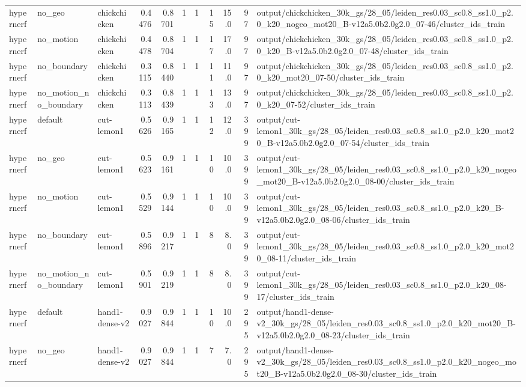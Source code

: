 \documentclass[10pt]{article}
\begin{document}
\begin{longtable}{lllrrrrrrrp{8cm}}
hypernerf & no\_geo & chickchicken & 0.4476 & 0.8701 & 1 & 1 & 15 & 15.0 & 97 & output/chickchicken\_30k\_gs/28\_05/leiden\_res0.03\_sc0.8\_ss1.0\_p2.0\_k20\_nogeo\_mot20\_B-v12a5.0b2.0g2.0\_07-46/cluster\_ids\_train \\
hypernerf & no\_motion & chickchicken & 0.4478 & 0.8704 & 1 & 1 & 17 & 17.0 & 97 & output/chickchicken\_30k\_gs/28\_05/leiden\_res0.03\_sc0.8\_ss1.0\_p2.0\_k20\_B-v12a5.0b2.0g2.0\_07-48/cluster\_ids\_train \\
hypernerf & no\_boundary & chickchicken & 0.3115 & 0.8440 & 1 & 1 & 11 & 11.0 & 97 & output/chickchicken\_30k\_gs/28\_05/leiden\_res0.03\_sc0.8\_ss1.0\_p2.0\_k20\_mot20\_07-50/cluster\_ids\_train \\
hypernerf & no\_motion\_no\_boundary & chickchicken & 0.3113 & 0.8439 & 1 & 1 & 13 & 13.0 & 97 & output/chickchicken\_30k\_gs/28\_05/leiden\_res0.03\_sc0.8\_ss1.0\_p2.0\_k20\_07-52/cluster\_ids\_train \\
hypernerf & default & cut-lemon1 & 0.5626 & 0.9165 & 1 & 1 & 12 & 12.0 & 399 & output/cut-lemon1\_30k\_gs/28\_05/leiden\_res0.03\_sc0.8\_ss1.0\_p2.0\_k20\_mot20\_B-v12a5.0b2.0g2.0\_07-54/cluster\_ids\_train \\
hypernerf & no\_geo & cut-lemon1 & 0.5623 & 0.9161 & 1 & 1 & 10 & 10.0 & 399 & output/cut-lemon1\_30k\_gs/28\_05/leiden\_res0.03\_sc0.8\_ss1.0\_p2.0\_k20\_nogeo\_mot20\_B-v12a5.0b2.0g2.0\_08-00/cluster\_ids\_train \\
hypernerf & no\_motion & cut-lemon1 & 0.5529 & 0.9144 & 1 & 1 & 10 & 10.0 & 399 & output/cut-lemon1\_30k\_gs/28\_05/leiden\_res0.03\_sc0.8\_ss1.0\_p2.0\_k20\_B-v12a5.0b2.0g2.0\_08-06/cluster\_ids\_train \\
hypernerf & no\_boundary & cut-lemon1 & 0.5896 & 0.9217 & 1 & 1 & 8 & 8.0 & 399 & output/cut-lemon1\_30k\_gs/28\_05/leiden\_res0.03\_sc0.8\_ss1.0\_p2.0\_k20\_mot20\_08-11/cluster\_ids\_train \\
hypernerf & no\_motion\_no\_boundary & cut-lemon1 & 0.5901 & 0.9219 & 1 & 1 & 8 & 8.0 & 399 & output/cut-lemon1\_30k\_gs/28\_05/leiden\_res0.03\_sc0.8\_ss1.0\_p2.0\_k20\_08-17/cluster\_ids\_train \\
hypernerf & default & hand1-dense-v2 & 0.9027 & 0.9844 & 1 & 1 & 10 & 10.0 & 295 & output/hand1-dense-v2\_30k\_gs/28\_05/leiden\_res0.03\_sc0.8\_ss1.0\_p2.0\_k20\_mot20\_B-v12a5.0b2.0g2.0\_08-23/cluster\_ids\_train \\
hypernerf & no\_geo & hand1-dense-v2 & 0.9027 & 0.9844 & 1 & 1 & 7 & 7.0 & 295 & output/hand1-dense-v2\_30k\_gs/28\_05/leiden\_res0.03\_sc0.8\_ss1.0\_p2.0\_k20\_nogeo\_mot20\_B-v12a5.0b2.0g2.0\_08-30/cluster\_ids\_train \\

\end{longtable}
\end{document}
